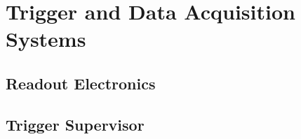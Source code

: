 \section{Trigger and Data Acquisition Systems}
\lipsum[1-2]

\subsection{Readout Electronics}
\lipsum[1-2]

\subsection{Trigger Supervisor}
\lipsum[1-2]
